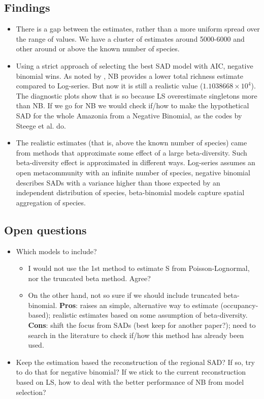 \documentclass[12pt, A4]{article}\usepackage[]{graphicx}\usepackage[]{color}
\begin{document}
\subsection*{Findings}
\begin{itemize}
\item There is a gap between the estimates, rather than a more uniform spread over the range of values. We have a cluster of estimates around 5000-6000 and other around or above the known number of species.
\item Using a strict approach of selecting the best SAD model with AIC, negative binomial wins. As noted by \citet{tovo2017}, NB provides a lower total richness estimate compared to Log-series. But now it is still a realistic value (\ensuremath{1.1038668\times 10^{4}}). The diagnostic plots show that is so because LS overestimate singletons more than NB. If we go for NB we would check if/how to make the hypothetical SAD for the whole Amazonia from a Negative Binomial, as the codes by Steege et al. do.
\item The realistic estimates (that is, above the known number of species)  
  came from methods that
  approximate some  effect of a large beta-diversity. 
  Such beta-diversity effect is approximated in different ways.
  Log-series assumes an open metacommunity with an infinite number of species,
  negative binomial describes SADs with a variance higher than those expected
  by an independent distribution of species, beta-binomial models
  capture spatial aggregation of species.
\end{itemize}

\subsection*{Open questions}

\begin{itemize}
\item Which models to include?
  \begin{itemize}
  \item I would not use the 1st method to estimate S from Poisson-Lognormal, nor the truncated beta method. Agree?
  \item On the other hand, not so sure if we should include truncated beta-binomial. \textbf{Pros}: raises an simple, alternative way to estimate (occupancy-based); realistic estimates based on some assumption of beta-diversity. \textbf{Cons}: shift the focus from SADs (best keep for another paper?); need to search in the literature to check if/how this method has already been used.
  \end{itemize}
\item Keep the estimation based the reconstruction of the regional SAD? If so, try to do that for negative binomial? If we stick to the current reconstruction based on LS, how to deal with the better performance of NB from model selection?
\end{itemize}
\end{document}
